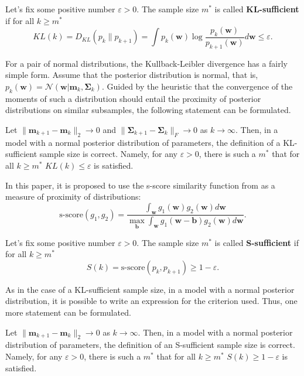 \documentclass[
11pt,%
tightenlines,%
twoside,%
onecolumn,%
nofloats,%
nobibnotes,%
nofootinbib,%
superscriptaddress,%
noshowpacs,%
centertags]%
{revtex4-2}
\begin{document}
\begin{definition}
    Let's fix some positive number $\varepsilon > 0$. The sample size $m^*$ is called \textbf{KL-sufficient} if for all $k\geqslant m^*$
    \[ KL(k) = D_{KL}(p_k \| p_{k+1}) = \int p_k(\mathbf{w}) \log{\dfrac{p_k(\mathbf{w})}{p_{k+1}(\mathbf{w})}} d\mathbf{w} \leqslant \varepsilon. \]
\end{definition}

For a pair of normal distributions, the Kullback-Leibler divergence has a fairly simple form. Assume that the posterior distribution is normal, that is, $p_k(\mathbf{w}) = \mathcal{N}\left(\mathbf{w}|\mathbf{m}_k, \mathbf{\Sigma}_k\right)$. Guided by the heuristic that the convergence of the moments of such a distribution should entail the proximity of posterior distributions on similar subsamples, the following statement can be formulated.

\begin{theorem}\label{theorem1}
    Let $\|\mathbf{m}_{k+1} - \mathbf{m}_k\|_2 \to 0$ and $\|\mathbf{\Sigma}_{k+1} - \mathbf{\Sigma}_k\|_{F}\to 0$ as $k\to \infty$. Then, in a model with a normal posterior distribution of parameters, the definition of a KL-sufficient sample size is correct. Namely, for any $\varepsilon > 0$, there is such a $m^*$ that for all $k\geqslant m^*$ $KL(k)\leqslant\varepsilon$ is satisfied.
\end{theorem}

In this paper, it is proposed to use the s-score similarity function from \citep{Aduenko2017} as a measure of proximity of distributions:
\[\text{s-score}(g_1, g_2) = \dfrac{\int_{\mathbf{w}} g_1(\mathbf{w}) g_2(\mathbf{w}) d\mathbf{w}}{\max_{\mathbf{b}} \int_{\mathbf{w}} g_1(\mathbf{w} - \mathbf{b}) g_2(\mathbf{w}) d\mathbf{w}}. \]

\begin{definition}
    Let's fix some positive number $\varepsilon > 0$. The sample size $m^*$ is called \textbf{S-sufficient} if for all $k\geqslant m^*$
    \[ S(k) = \text{s-score}(p_k, p_{k+1}) \geqslant 1-\varepsilon. \]
\end{definition}

As in the case of a KL-sufficient sample size, in a model with a normal posterior distribution, it is possible to write an expression for the criterion used. Thus, one more statement can be formulated.

\begin{theorem}\label{theorem2}
    Let $\|\mathbf{m}_{k+1} - \mathbf{m}_k\|_2\to 0$ as $k \to \infty$. Then, in a model with a normal posterior distribution of parameters, the definition of an S-sufficient sample size is correct. Namely, for any $\varepsilon > 0$, there is such a $m^*$ that for all $k\geqslant m^*$ $S(k)\geqslant 1-\varepsilon$ is satisfied.
\end{theorem}
\end{document}
